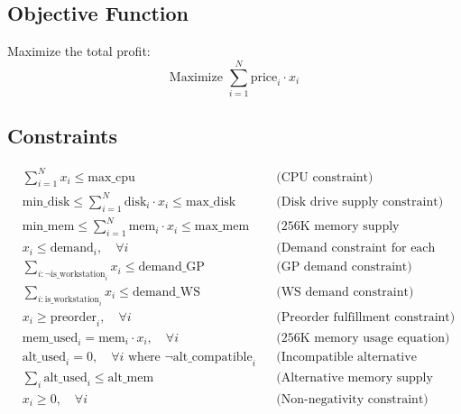 \documentclass{article}
\begin{document}
\subsection*{Objective Function}
Maximize the total profit:
\[
\text{Maximize } \sum_{i=1}^{N} \text{price}_i \cdot x_i
\]

\subsection*{Constraints}
\begin{align*}
    & \sum_{i=1}^{N} x_i \leq \text{max\_cpu} && \text{(CPU constraint)} \\
    & \text{min\_disk} \leq \sum_{i=1}^{N} \text{disk}_i \cdot x_i \leq \text{max\_disk} && \text{(Disk drive supply constraint)} \\
    & \text{min\_mem} \leq \sum_{i=1}^{N} \text{mem}_i \cdot x_i \leq \text{max\_mem} && \text{(256K memory supply constraint)} \\
    & x_i \leq \text{demand}_i, \quad \forall i && \text{(Demand constraint for each system)} \\
    & \sum_{i: \neg \text{is\_workstation}_i} x_i \leq \text{demand\_GP} && \text{(GP demand constraint)} \\
    & \sum_{i: \text{is\_workstation}_i} x_i \leq \text{demand\_WS} && \text{(WS demand constraint)} \\
    & x_i \geq \text{preorder}_i, \quad \forall i && \text{(Preorder fulfillment constraint)} \\
    & \text{mem\_used}_i = \text{mem}_i \cdot x_i, \quad \forall i && \text{(256K memory usage equation)} \\
    & \text{alt\_used}_i = 0, \quad \forall i \text{ where } \neg \text{alt\_compatible}_i && \text{(Incompatible alternative memory use)} \\
    & \sum_{i} \text{alt\_used}_i \leq \text{alt\_mem} && \text{(Alternative memory supply constraint)} \\
    & x_i \geq 0, \quad \forall i && \text{(Non-negativity constraint)}
\end{align*}
\end{document}
